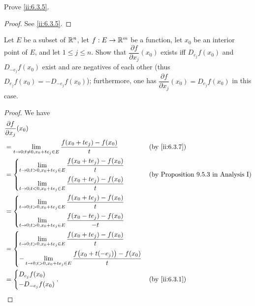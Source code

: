 \exercisesection

\begin{ex}\label{ii:ex:6.3.1}
  Prove \cref{ii:6.3.5}.
\end{ex}

\begin{proof}
  See \cref{ii:6.3.5}.
\end{proof}

\begin{ex}\label{ii:ex:6.3.2}
  Let \(E\) be a subset of \(\mathbb{R}^n\), let \(f : E \to \mathbb{R}^m\) be a function, let \(x_0\) be an interior point of \(E\), and let \(1 \leq j \leq n\).
  Show that \(\dfrac{\partial f}{\partial x_j}(x_0)\) exists iff \(D_{e_j} f(x_0)\) and \(D_{-e_j} f(x_0)\) exist and are negatives of each other
  (thus \(D_{e_j} f(x_0) = -D_{-e_j} f(x_0)\));
  furthermore, one has \(\dfrac{\partial f}{\partial x_j}(x_0) = D_{e_j} f(x_0)\) in this case.
\end{ex}

\begin{proof}
  We have
  \begin{align*}
     & \dfrac{\partial f}{\partial x_j}(x_0)                                                                       \\
     & = \lim_{t \to 0 ; t \neq 0, x_0 + t e_j \in E} \dfrac{f(x_0 + t e_j) - f(x_0)}{t}        &  & \by{ii:6.3.7} \\
     & = \begin{dcases}
           \lim_{t \to 0 ; t > 0, x_0 + t e_j \in E} \dfrac{f(x_0 + t e_j) - f(x_0)}{t} \\
           \lim_{t \to 0 ; t < 0, x_0 + t e_j \in E} \dfrac{f(x_0 + t e_j) - f(x_0)}{t}
         \end{dcases}          &  & \text{(by Proposition 9.5.3 in Analysis I)}                              \\
     & = \begin{dcases}
           \lim_{t \to 0 ; t > 0, x_0 + t e_j \in E} \dfrac{f(x_0 + t e_j) - f(x_0)}{t} \\
           \lim_{t \to 0 ; t > 0, x_0 + t e_j \in E} \dfrac{f(x_0 - t e_j) - f(x_0)}{-t}
         \end{dcases}                              \\
     & = \begin{dcases}
           \lim_{t \to 0 ; t > 0, x_0 + t e_j \in E} \dfrac{f(x_0 + t e_j) - f(x_0)}{t} \\
           -\lim_{t \to 0 ; t > 0, x_0 + t e_j \in E} \dfrac{f\big(x_0 + t (-e_j)\big) - f(x_0)}{t}
         \end{dcases}                   \\
     & = \begin{dcases}
           D_{e_j} f(x_0) \\
           - D_{-e_j} f(x_0)
         \end{dcases}.                                                                        &  & \by{ii:6.3.1}
  \end{align*}
\end{proof}

